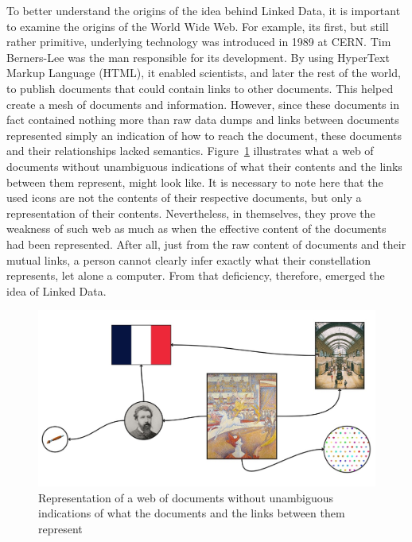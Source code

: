 To better understand the origins of the idea behind Linked Data, it is important to examine the origins of the World Wide Web. For example, its first, but still rather primitive, underlying technology was introduced in 1989 at CERN. Tim Berners-Lee was the man responsible for its development. By using HyperText Markup Language (HTML), it enabled scientists, and later the rest of the world, to publish documents that could contain links to other documents. This helped create a mesh of documents and information. However, since these documents in fact contained nothing more than raw data dumps and links between documents represented simply an indication of how to reach the document, these documents and their relationships lacked semantics. Figure~\ref{fig:no_linked_data} illustrates what a web of documents without unambiguous indications of what their contents and the links between them represent, might look like. It is necessary to note here that the used icons are not the contents of their respective documents, but only a representation of their contents. Nevertheless, in themselves, they prove the weakness of such web as much as when the effective content of the documents had been represented. After all, just from the raw content of documents and their mutual links, a person cannot clearly infer exactly what their constellation represents, let alone a computer. From that deficiency, therefore, emerged the idea of Linked Data. \citep{jacksi2019development} \citep{bizer2011linked}

\begin{figure}[htbp]
    \centering
	\includegraphics[width=\textwidth]{images/no_linked_data.jpg}
    \captionsetup{justification=centering}
	\caption{Representation of a web of documents without unambiguous indications of what the documents and the links between them represent}
	\label{fig:no_linked_data}
\end{figure}

